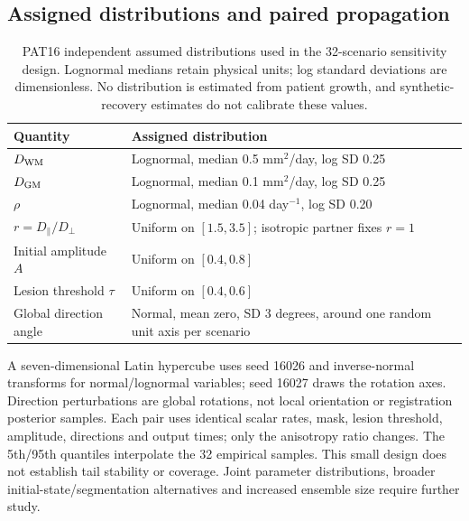 \subsection{Assigned distributions and paired propagation}
\begin{table}[tbp]
\centering\small
\caption{PAT16 independent assumed distributions used in the 32-scenario sensitivity design. Lognormal medians retain physical units; log standard deviations are dimensionless. No distribution is estimated from patient growth, and synthetic-recovery estimates do not calibrate these values.}\label{tab:pat16_priors}
\begin{tabularx}{\textwidth}{lY}
\toprule Quantity & Assigned distribution\\\midrule
$D_{\rm WM}$ & Lognormal, median 0.5 mm$^2$/day, log SD 0.25\\
$D_{\rm GM}$ & Lognormal, median 0.1 mm$^2$/day, log SD 0.25\\
$\rho$ & Lognormal, median 0.04 day$^{-1}$, log SD 0.20\\
$r=D_\parallel/D_\perp$ & Uniform on $[1.5,3.5]$; isotropic partner fixes $r=1$\\
Initial amplitude $A$ & Uniform on $[0.4,0.8]$\\
Lesion threshold $\tau$ & Uniform on $[0.4,0.6]$\\
Global direction angle & Normal, mean zero, SD 3 degrees, around one random unit axis per scenario\\\bottomrule
\end{tabularx}
\end{table}

A seven-dimensional Latin hypercube uses seed 16026 and inverse-normal transforms for normal/lognormal variables; seed 16027 draws the rotation axes. Direction perturbations are global rotations, not local orientation or registration posterior samples. Each pair uses identical scalar rates, mask, lesion threshold, amplitude, directions and output times; only the anisotropy ratio changes. The 5th/95th quantiles interpolate the 32 empirical samples. This small design does not establish tail stability or coverage. Joint parameter distributions, broader initial-state/segmentation alternatives and increased ensemble size require further study.

